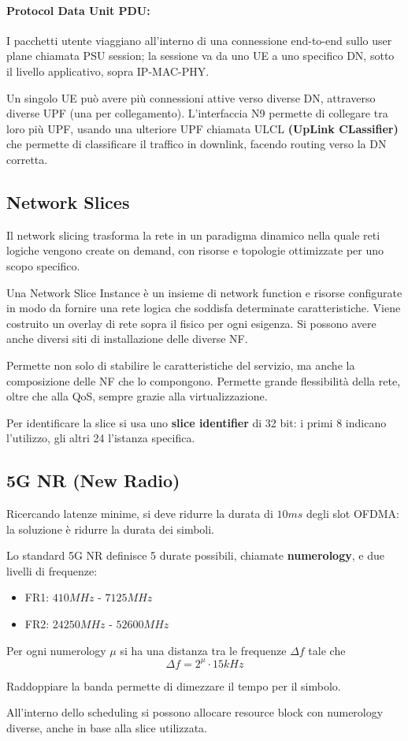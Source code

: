 \paragraph{Protocol Data Unit PDU:} I pacchetti utente viaggiano all'interno di una connessione end-to-end sullo user plane chiamata PSU session; la sessione va da uno UE a uno specifico DN, sotto il livello applicativo, sopra IP-MAC-PHY.

Un singolo UE può avere più connessioni attive verso diverse DN, attraverso diverse UPF (una per collegamento). L'interfaccia N9 permette di collegare tra loro più UPF, usando una ulteriore UPF chiamata ULCL \textbf{(UpLink CLassifier)} che permette di classificare il traffico in downlink, facendo routing verso la DN corretta.

\subsection{Network Slices}

Il network slicing trasforma la rete in un paradigma dinamico nella quale reti logiche vengono create on demand, con risorse e topologie ottimizzate per uno scopo specifico. 

Una Network Slice Instance è un insieme di network function e risorse configurate in modo da fornire una rete logica che soddisfa determinate caratteristiche. Viene costruito un overlay di rete sopra il fisico per ogni esigenza. Si possono avere anche diversi siti di installazione delle diverse NF.

Permette non solo di stabilire le caratteristiche del servizio, ma anche la composizione delle NF che lo compongono. Permette grande flessibilità della rete, oltre che alla QoS, sempre grazie alla virtualizzazione.

Per identificare la slice si usa uno \textbf{slice identifier} di 32 bit: i primi 8 indicano l'utilizzo, gli altri 24 l'istanza specifica.

\subsection{5G NR (New Radio)}

Ricercando latenze minime, si deve ridurre la durata di $10ms$ degli slot OFDMA: la soluzione è ridurre la durata dei simboli.

Lo standard 5G NR definisce 5 durate possibili, chiamate \textbf{numerology}, e due livelli di frequenze: 
\begin{itemize}
    \item FR1: $410MHz$ - $7125MHz$
    \item FR2: $24250MHz$ - $52600MHz$
\end{itemize}

Per ogni numerology $\mu$ si ha una distanza tra le frequenze $\Delta f$ tale che
$$ \Delta f = 2^\mu \cdot 15 kHz$$

Raddoppiare la banda permette di dimezzare il tempo per il simbolo. 

All'interno dello scheduling si possono allocare resource block con numerology diverse, anche in base alla slice utilizzata.